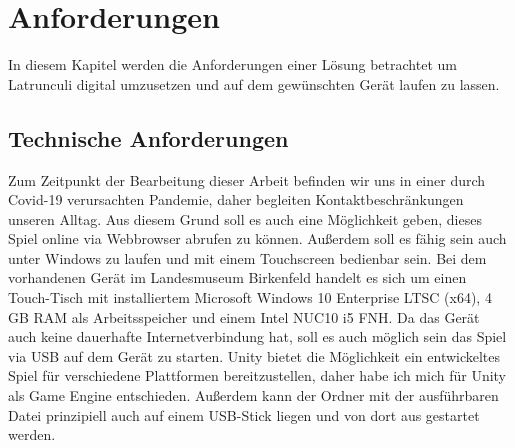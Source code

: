 
\chapter{Anforderungen}
\label{ch:Analyse}
In diesem Kapitel werden die Anforderungen einer Lösung betrachtet um Latrunculi digital umzusetzen und auf dem gewünschten Gerät laufen zu lassen.


\section{Technische Anforderungen}
\label{ch:Analyse:sec:TechAnforderungen}
Zum Zeitpunkt der Bearbeitung dieser Arbeit befinden wir uns in einer durch Covid-19 verursachten Pandemie, daher begleiten Kontaktbeschränkungen unseren Alltag. Aus diesem Grund soll es auch eine Möglichkeit geben, dieses Spiel online via Webbrowser abrufen zu können. Außerdem soll es fähig sein auch unter Windows zu laufen und mit einem Touchscreen bedienbar sein. Bei dem vorhandenen Gerät im Landesmuseum Birkenfeld handelt es sich um einen Touch-Tisch mit installiertem Microsoft Windows 10 Enterprise LTSC (x64), 4 GB RAM als Arbeitsspeicher und einem Intel NUC10 i5 FNH. Da das Gerät auch keine dauerhafte Internetverbindung hat, soll es auch möglich sein das Spiel via USB auf dem Gerät zu starten. Unity bietet die Möglichkeit ein entwickeltes Spiel für verschiedene Plattformen bereitzustellen, daher habe ich mich für Unity als Game Engine entschieden. Außerdem kann der Ordner mit der ausführbaren Datei prinzipiell auch auf einem USB-Stick liegen und von dort aus gestartet werden.

